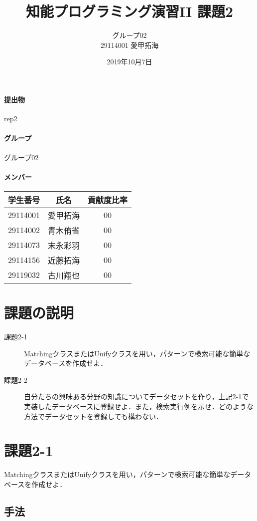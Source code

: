 \documentclass[a4j]{jarticle}
\title{知能プログラミング演習II 課題2}
\author{グループ02\\
  29114001 愛甲拓海\\}
\date{2019年10月7日}
\begin{document}
\maketitle

\paragraph{提出物} rep2
\paragraph{グループ} グループ02
\paragraph{メンバー}
\begin{tabular}{|c|c|c|}
  \hline
  学生番号&氏名&貢献度比率\\
  \hline\hline
  29114001&愛甲拓海&00\\
  \hline
  29114002&青木侑省&00\\
  \hline
  29114073&末永彩羽&00\\
  \hline
  29114156&近藤拓海&00\\
  \hline
  29119032&古川翔也&00\\
  \hline
\end{tabular}



\section{課題の説明}
\begin{description}
\item[課題2-1] MatchingクラスまたはUnifyクラスを用い，パターンで検索可能な簡単なデータベースを作成せよ．
\item[課題2-2]     自分たちの興味ある分野の知識についてデータセットを作り，上記2-1で実装したデータベースに登録せよ．また，検索実行例を示せ．どのような方法でデータセットを登録しても構わない．
\end{description}


\section{課題2-1}
\begin{screen}
  MatchingクラスまたはUnifyクラスを用い，パターンで検索可能な簡単なデータベースを作成せよ．
\end{screen}

\subsection{手法}
\end{document}

